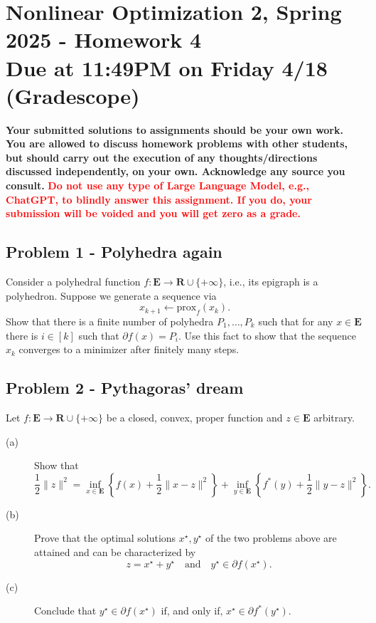\documentclass[11pt]{article}
\date{}
\title{}
\newcommand{\RR}{\mathbf{R}}
\newcommand{\EEE}{\mathbf{E}}
\begin{document}
\section*{\textbf{Nonlinear Optimization 2, Spring 2025 - Homework 4} \\ Due at 11:49PM on Friday 4/18 (Gradescope)}
\label{sec:orgcd5db79}
\textbf{Your submitted solutions to assignments should be your own work. You are allowed to discuss homework problems with other students, but should carry out the execution of any thoughts/directions discussed independently, on your own. Acknowledge any source you consult.}
\textbf{\textcolor{red}{Do not use any type of Large Language Model, e.g., ChatGPT, to blindly answer this assignment. If you do, your submission will be voided and you will get zero as a grade.}} \vspace{.5cm}
\subsection*{Problem 1 - Polyhedra again}
\label{sec:org0de9819}
Consider a polyhedral function \(f \colon \EEE \rightarrow \RR \cup \{+\infty\}\), i.e., its epigraph is a polyhedron. Suppose we generate a sequence via
$$
x_{k+1} \leftarrow \textrm{prox}_{f}(x_{k}).
$$
Show that there is a finite number of polyhedra \(P_1, \dots, P_k\) such that for any \(x\in \EEE\) there is \(i \in [k]\) such that \(\partial f(x) = P_{i}\). Use this fact to show that the sequence \(x_k\) converges to a minimizer after finitely many steps.
\subsection*{Problem 2 - Pythagoras' dream}
\label{sec:orgbe05fde}
Let \(f\colon \EEE \rightarrow \RR \cup \{+ \infty \}\) be a closed, convex, proper function and \(z \in \EEE\) arbitrary.
\begin{description}
\item[(a)] Show that
$$
\frac{1}{2}\|z\|^{2} = \inf_{x \in \EEE} \left\{f(x) + \frac{1}{2}\|x - z\|^{2}\right\} + \inf_{y \in \EEE} \left\{f^{*}(y) + \frac{1}{2}\|y - z\|^{2}\right\}.
$$
\item[(b)] Prove that the optimal solutions $x^{\star}, y^{\star}$ of the two problems above are attained and can be characterized by
$$
z = x^{\star} + y^{\star} \quad \text{and} \quad y^{\star} \in \partial f(x^{\star}).
$$
\item[(c)] Conclude that $y^{\star} \in \partial f(x^\star)$ if, and only if, $x^\star \in \partial f^*(y^\star)$.
\end{description}
\end{document}
